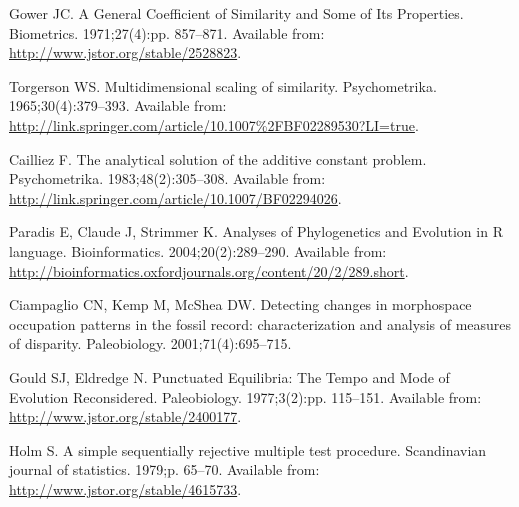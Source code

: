 \documentclass[12pt,letterpaper]{article}
\begin{document}
\begin{thebibliography}{10}
Gower JC.
\newblock A General Coefficient of Similarity and Some of Its Properties.
\newblock Biometrics. 1971;27(4):pp. 857--871.
\newblock Available from: \url{http://www.jstor.org/stable/2528823}.

Torgerson WS.
\newblock Multidimensional scaling of similarity.
\newblock Psychometrika. 1965;30(4):379--393.
\newblock Available from:
  \url{http://link.springer.com/article/10.1007%2FBF02289530?LI=true}.

Cailliez F.
\newblock The analytical solution of the additive constant problem.
\newblock Psychometrika. 1983;48(2):305--308.
\newblock Available from:
  \url{http://link.springer.com/article/10.1007/BF02294026}.

Paradis E, Claude J, Strimmer K.
 Analyses of Phylogenetics and Evolution in {R} language.
\newblock Bioinformatics. 2004;20(2):289--290.
\newblock Available from:
  \url{http://bioinformatics.oxfordjournals.org/content/20/2/289.short}.

Ciampaglio CN, Kemp M, McShea DW.
\newblock Detecting changes in morphospace occupation patterns in the fossil
  record: characterization and analysis of measures of disparity.
\newblock Paleobiology. 2001;71(4):695--715.

Gould SJ, Eldredge N.
\newblock Punctuated {E}quilibria: The Tempo and Mode of Evolution
  Reconsidered.
\newblock Paleobiology. 1977;3(2):pp. 115--151.
\newblock Available from: \url{http://www.jstor.org/stable/2400177}.

Holm S.
\newblock A simple sequentially rejective multiple test procedure.
\newblock Scandinavian journal of statistics. 1979;p. 65--70.
\newblock Available from: \url{http://www.jstor.org/stable/4615733}.

\end{thebibliography}
\end{document}

